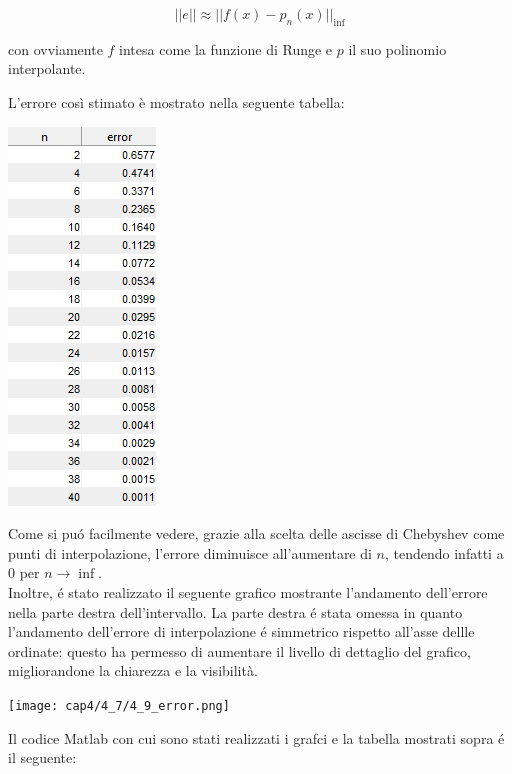 $$
||e|| \approx ||f(x) - p_n(x)||_{\inf}
$$

\noindent con ovviamente $f$ intesa come la funzione di Runge e $p$ il suo polinomio interpolante.

\noindent L'errore così stimato è mostrato nella seguente tabella:

\begin{center}
	\includegraphics[scale=0.7]{cap4/4_7/4_7_error.png}
\end{center}

\noindent Come si pu\'o facilmente vedere, grazie alla scelta delle ascisse di Chebyshev come punti di interpolazione, l'errore diminuisce all'aumentare di \(n\), tendendo infatti a \(0\) per \(n \to \inf\).\\

\noindent Inoltre, \'e stato realizzato il seguente grafico mostrante l'andamento dell'errore nella parte destra dell'intervallo. La parte destra \'e stata omessa in quanto l'andamento dell'errore di interpolazione \'e simmetrico rispetto all'asse dellle ordinate: questo ha permesso di aumentare il livello di dettaglio del grafico, migliorandone la chiarezza e la visibilità.

\begin{center}
	\texttt{[image: cap4/4\_7/4\_9\_error.png]}
\end{center}

\noindent Il codice Matlab con cui sono stati realizzati i grafci e la tabella mostrati sopra \'e il seguente: \\



